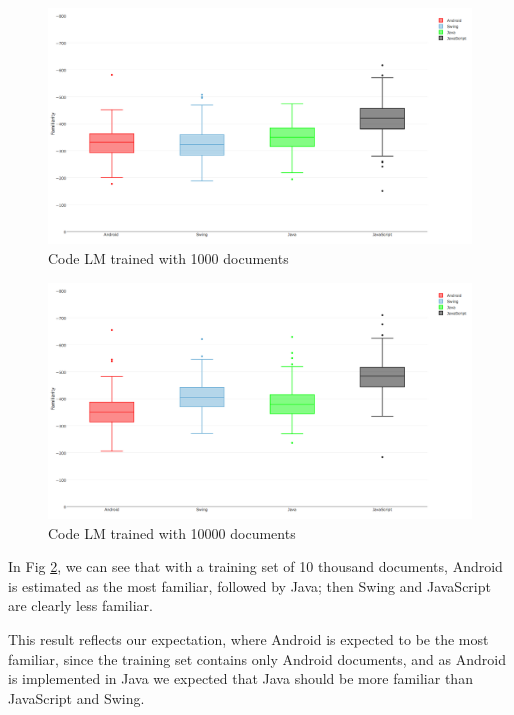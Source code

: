 \documentclass[12pt,mscthesis]{usiinfthesis}
\begin{document}
{\begin{figure}[H]
			\centering
			\includegraphics[width=\textwidth]{code1000}
			\caption{Code LM trained with 1000 documents}
			\label{code1000}
			\end{figure}

 

\begin{figure}[H]
			\centering
			\includegraphics[width=\textwidth]{code10000}
			\caption{Code LM trained with 10000 documents}
			\label{code10000}
			\end{figure}		
In Fig \ref{code10000}, we can see that with a training set of 10 thousand documents, Android is estimated as the most familiar, followed by Java; then Swing and JavaScript are clearly less familiar.

This result reflects our expectation, where Android is expected to be the most familiar, since the training set contains only Android documents, and as Android is implemented in Java we expected that Java should be more familiar than JavaScript and Swing.

}
\end{document}
